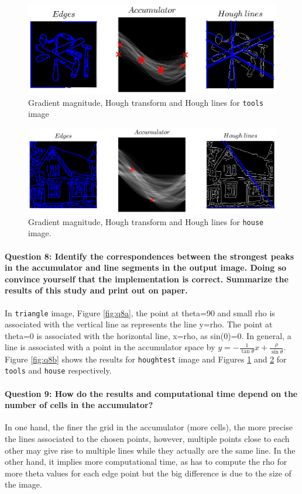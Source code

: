 \documentclass[12pt]{article}
\begin{document}
\begin{figure}[htbp]
 \centering
 \includegraphics[width=\textwidth]{q8c}
 \caption{Gradient magnitude, Hough transform and Hough lines for \texttt{tools} image}
 \label{fig:q8c}
\end{figure}

\begin{figure}[htbp]
 \centering
 \includegraphics[width=\textwidth]{q8d}
 \caption{Gradient magnitude, Hough transform and Hough lines for \texttt{house} image.}
 \label{fig:q8d}
\end{figure}

\paragraph{Question 8: Identify the correspondences between the strongest peaks in the accumulator and line segments in the output image. Doing so convince yourself that the implementation is correct. Summarize the results of this study and print out on paper.} In \texttt{triangle} image, Figure \ref{fig:q8a}, the point at theta=90 and small rho is associated with the vertical line as represents the line y=rho. The point at theta=0 is associated with the horizontal line, x=rho, as sin(0)=0. In general, a line is associated with a point in the accumulator space by \(y=-\frac{1}{\tan\theta}x+\frac{\rho}{\sin\theta}\). Figure \ref{fig:q8b} shows the results for \texttt{houghtest} image and Figures \ref{fig:q8c} and \ref{fig:q8d} for \texttt{tools} and \texttt{house} respectively.

\paragraph{Question 9: How do the results and computational time depend on the number of cells in the accumulator?}
In one hand, the finer the grid in the accumulator (more cells), the more precise the lines associated to the chosen points, however, multiple points close to each other may give rise to multiple lines while they actually are the same line. In the other hand,  it implies more computational time, as has to compute the rho for more theta values for each edge point but the big difference is due to the size of the image.
\end{document}
